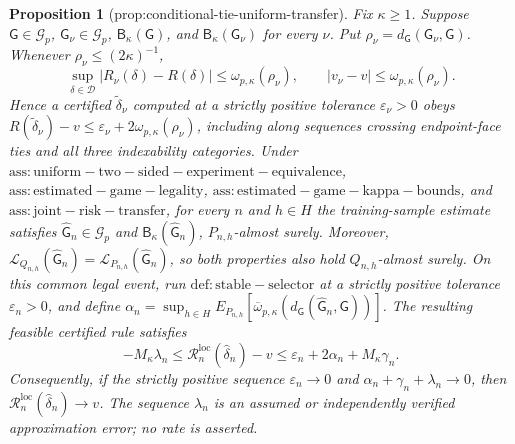 \documentclass{article}
\newtheorem{proposition}{Proposition}
\begin{document}
\begin{proposition}[prop:conditional-tie-uniform-transfer]\label{prop:conditional-tie-uniform-transfer}
Fix \(\kappa\ge1\). Suppose \(\mathsf G\in\mathcal G_p\), \(\mathsf G_{\nu}\in\mathcal G_p\), \(\mathsf B_{\kappa}(\mathsf G)\), and \(\mathsf B_{\kappa}(\mathsf G_{\nu})\) for every \(\nu\). Put \(\rho_{\nu}=d_{\mathsf G}(\mathsf G_{\nu},\mathsf G)\). Whenever \(\rho_{\nu}\le(2\kappa)^{-1}\), \[\sup_{\delta\in\mathcal D}|R_{\nu}(\delta)-R(\delta)|\le\omega_{p,\kappa}(\rho_{\nu}),\qquad |v_{\nu}-v|\le\omega_{p,\kappa}(\rho_{\nu}).\] Hence a certified \(\widetilde\delta_{\nu}\) computed at a strictly positive tolerance \(\varepsilon_{\nu}>0\) obeys \(R(\widetilde\delta_{\nu})-v\le\varepsilon_{\nu}+2\omega_{p,\kappa}(\rho_{\nu})\), including along sequences crossing endpoint-face ties and all three indexability categories. Under \(\mathrm{ass:uniform-two-sided-experiment-equivalence}\), \(\mathrm{ass:estimated-game-legality}\), \(\mathrm{ass:estimated-game-kappa-bounds}\), and \(\mathrm{ass:joint-risk-transfer}\), for every \(n\) and \(h\in H\) the training-sample estimate satisfies \(\widehat{\mathsf G}_n\in\mathcal G_p\) and \(\mathsf B_{\kappa}(\widehat{\mathsf G}_n)\), \(P_{n,h}\)-almost surely. Moreover, \(\mathcal L_{Q_{n,h}}(\widehat{\mathsf G}_n)=\mathcal L_{P_{n,h}}(\widehat{\mathsf G}_n)\), so both properties also hold \(Q_{n,h}\)-almost surely. On this common legal event, run \(\mathrm{def:stable-selector}\) at a strictly positive tolerance \(\varepsilon_n>0\), and define \(\alpha_n=\sup_{h\in H}E_{P_{n,h}}[\overline\omega_{p,\kappa}(d_{\mathsf G}(\widehat{\mathsf G}_n,\mathsf G))]\). The resulting feasible certified rule satisfies \[-M_{\kappa}\lambda_n\le\mathcal R_n^{\mathrm{loc}}(\widehat\delta_n)-v\le\varepsilon_n+2\alpha_n+M_{\kappa}\gamma_n.\] Consequently, if the strictly positive sequence \(\varepsilon_n\to0\) and \(\alpha_n+\gamma_n+\lambda_n\to0\), then \(\mathcal R_n^{\mathrm{loc}}(\widehat\delta_n)\to v\). The sequence \(\lambda_n\) is an assumed or independently verified approximation error; no rate is asserted.
\end{proposition}
\end{document}
